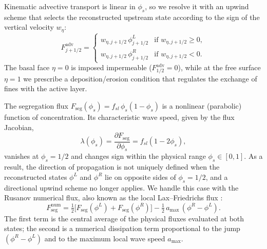 \documentclass[lineno]{JFM-FLM_Au}
\begin{document}
Kinematic advective transport is linear in $\phi_s$, so we resolve it with an upwind scheme that selects the reconstructed upstream state according to the sign of the vertical velocity $w_\eta$:
\begin{equation}
    F^{\mathrm{adv}}_{j+1/2} =
    \begin{cases}
        w_{\eta,j+1/2}\, \phi^{L}_{j+1/2} & \text{if } w_{\eta,j+1/2} \geq 0, \\
        w_{\eta,j+1/2}\, \phi^{R}_{j+1/2} & \text{if } w_{\eta,j+1/2} < 0.
    \end{cases}
    \label{eq:adv_flux}
\end{equation}
The basal face $\eta=0$ is imposed impermeable ($F^{\mathrm{adv}}_{1/2}=0$), while at the free surface $\eta=1$ we prescribe a deposition/erosion condition that regulates the exchange of fines with the active layer.

The segregation flux $F_{\mathrm{seg}}(\phi_s)=f_{sl}\,\phi_s(1-\phi_s)$ is a nonlinear (parabolic) function of concentration. Its characteristic wave speed, given by the flux Jacobian,
\begin{equation}
    \lambda(\phi_s) = \frac{\partial F_{\mathrm{seg}}}{\partial \phi_s} = f_{sl}(1-2\phi_s),
    \label{eq:jacobian}
\end{equation}
vanishes at $\phi_s=1/2$ and changes sign within the physical range $\phi_s\in[0,1]$. As a result, the direction of propagation is not uniquely defined when the reconstructed states $\phi^L$ and $\phi^R$ lie on opposite sides of $\phi_s=1/2$, and a directional upwind scheme no longer applies. We handle this case with the Rusanov numerical flux, also known as the local Lax--Friedrichs flux \citep{rusanov1961, toro2009}:
\begin{equation}
    F^{\mathrm{num}}_{\mathrm{seg}} = \tfrac{1}{2}\big[F_{\mathrm{seg}}(\phi^L) + F_{\mathrm{seg}}(\phi^R)\big] - \tfrac{1}{2}\, a_{\max}\,(\phi^R-\phi^L).
    \label{eq:rusanov}
\end{equation}
The first term is the central average of the physical fluxes evaluated at both states; the second is a numerical dissipation term proportional to the jump $(\phi^R-\phi^L)$ and to the maximum local wave speed $a_{\max}$.
\end{document}
